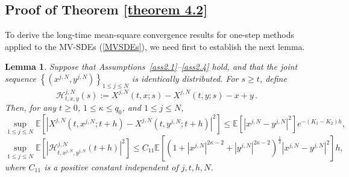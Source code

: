 \documentclass[12pt]{article}
\numberwithin{equation}{section}
\newtheorem{lemma}[assumption]{Lemma}
\begin{document}
\subsection{Proof of Theorem \ref{theorem 4.2}}
To derive the long-time mean-square convergence results for one-step methods applied to the MV-SDEs (\ref{MVSDEs}), we need first to establish    the next lemma.
\begin{lemma}\label{lemma 4.1}
    Suppose that Assumptions~\ref{ass2.1}--\ref{ass2.4} hold, and that the joint sequence $\left\{ \left( x^{j,N},y^{j,N} \right) \right\} _{1\leq j\leq N}$ is identically distributed. For $s\ge t$, define 
\begin{equation}\tag{5.24}\label{4.5}
\mathcal{H} _{t,x,y}^{j,N}\left(s\right):=X^{j,N}\left(t,x;s \right)-X^{j,N}\left(t,y;s\right)-x+y\,. 
\end{equation}
Then, for any $t \geq 0$, $1 \leq\kappa\leq q_0$, and $1 \leq j \leq N$,
\begin{equation}\tag{5.25}\label{4.6}
 \underset{1\leqslant j\leqslant N}{\sup}\mathbb{E}\left[\left|X^{j,N}\left(t, x^{j,N} ; t+h\right)-X^{j,N}\left(t, y^{j,N} ; t+h\right)\right|^{2}\right] \leq\mathbb{E}\left[\left|x^{j,N}-y^{j,N}\right|^{2}\right] e^{-\left(K_1-K_2\right) h}, 
 \end{equation}
 \begin{equation}\tag{5.26}\label{4.7}
\underset{1\leqslant j\leqslant N}{\sup}\mathbb{E}\left[\left|\mathcal{H}^{j,N}_{t, x^{j,N}, y^{j,N}}\left(t+h\right)\right|^{2}\right] \leq C_{11}\mathbb{E}\left[\left(1+\left|x^{j,N}\right|^{2 \kappa-2}+\left|y^{j,N}\right|^{2 \kappa-2}\right)^{\frac{1}{2}}\left|x^{j,N}-y^{j,N}\right|^{2}\right] h,
\end{equation}
where $C_{11} $ is a positive constant independent of $j,t, h, N $.
\end{lemma}
\end{document}
